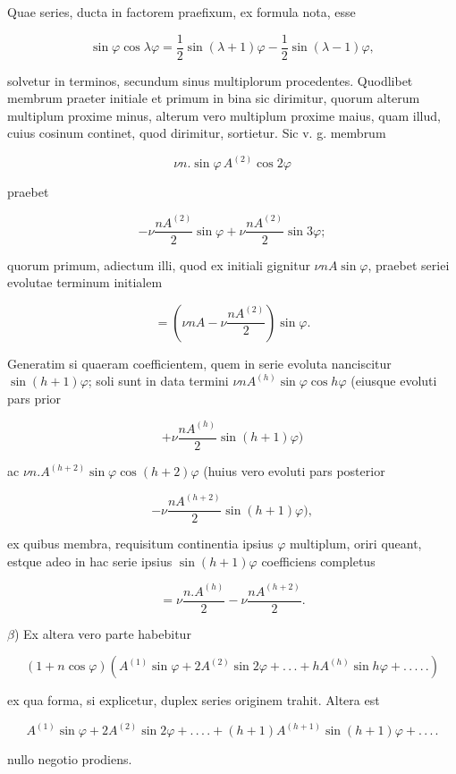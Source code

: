 \par\noindent{}%
Quae series, ducta in factorem praefixum, ex formula nota, esse

\[
\sin\varphi\cos\lambda\varphi=\frac{1}{2}\sin(\lambda+1)\varphi-\frac{1}{2}\sin(\lambda-1)\varphi,
\]

\noindent solvetur in terminos, secundum sinus multiplorum procedentes. Quodlibet membrum
praeter initiale et primum in bina sic dirimitur, quorum alterum multiplum proxime
minus, alterum vero multiplum proxime maius, quam illud, cuius cosinum continet, quod
dirimitur, sortietur. Sic v. g. membrum

\[
\nu n . \sin\varphi\,A^{(2)}\cos2\varphi
\]

\noindent praebet

\[
-\nu\frac{nA^{(2)}}{2}\sin\varphi+\nu\frac{nA^{(2)}}{2}\sin3\varphi;
\]

\noindent quorum primum, adiectum illi, quod ex initiali gignitur $\nu nA\sin\varphi$, praebet seriei
evolutae terminum initialem

\[
=\left(\nu nA-\nu\frac{nA^{(2)}}{2}\right)\sin\varphi.
\]

Generatim si quaeram coefficientem, quem in serie evoluta nanciscitur $\sin(h+1)\varphi$;
soli sunt in data termini $\nu nA^{(h)}\sin\varphi\cos h\varphi$ (eiusque evoluti pars prior

\[
+\nu\frac{nA^{(h)}}{2}\sin(h+1)\varphi)
\]

\noindent ac $\nu n.A^{(h+2)}\sin\varphi\cos(h+2)\varphi$ (huius vero evoluti pars posterior

\[
-\nu\frac{nA^{(h+2)}}{2}\sin(h+1)\varphi),
\]

\noindent ex quibus membra, requisitum continentia ipsius $\varphi$ multiplum, oriri queant, estque
adeo in hac serie ipsius $\sin(h+1)\varphi$ coefficiens completus




\[
=\nu\frac{n.A^{(h)}}{2}-\nu\frac{nA^{(h+2)}}{2}.
\]

$\beta$) Ex altera vero parte habebitur

\[
(1+n\cos\varphi)\left(A^{(1)}\sin\varphi+2A^{(2)}\sin2\varphi+.\,.\,.+hA^{(h)}\sin h\varphi+.\,.\,.\,.\,.\right)
\]

\noindent ex qua forma, si explicetur, duplex series originem trahit. Altera est

\[
A^{(1)}\sin\varphi+2A^{(2)}\sin2\varphi+.\,.\,.\,.+(h+1)A^{(h+1)}\sin(h+1)\varphi+.\,.\,.\,.
\]

\noindent nullo negotio prodiens.
